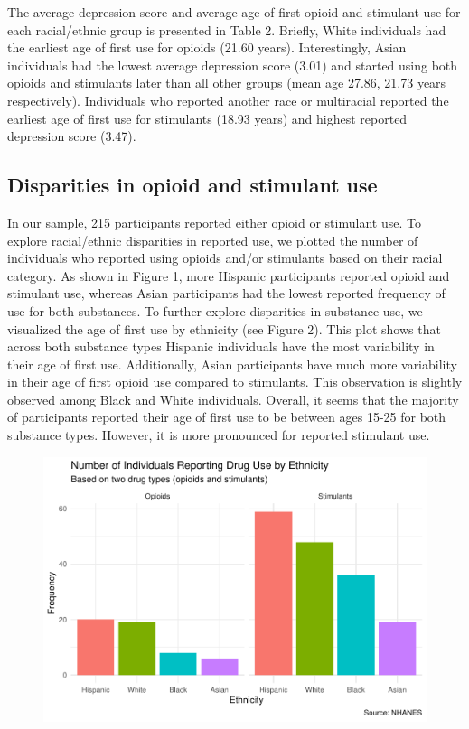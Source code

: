 \documentclass[man]{apa6}
\begin{document}
The average depression score and average age of first opioid and
stimulant use for each racial/ethnic group is presented in Table 2.
Briefly, White individuals had the earliest age of first use for opioids
(21.60 years). Interestingly, Asian individuals had the lowest average
depression score (3.01) and started using both opioids and stimulants
later than all other groups (mean age 27.86, 21.73 years respectively).
Individuals who reported another race or multiracial reported the
earliest age of first use for stimulants (18.93 years) and highest
reported depression score (3.47).

\subsection{Disparities in opioid and stimulant
use}\label{disparities-in-opioid-and-stimulant-use}

In our sample, 215 participants reported either opioid or stimulant use.
To explore racial/ethnic disparities in reported use, we plotted the
number of individuals who reported using opioids and/or stimulants based
on their racial category. As shown in Figure 1, more Hispanic
participants reported opioid and stimulant use, whereas Asian
participants had the lowest reported frequency of use for both
substances. To further explore disparities in substance use, we
visualized the age of first use by ethnicity (see Figure 2). This plot
shows that across both substance types Hispanic individuals have the
most variability in their age of first use. Additionally, Asian
participants have much more variability in their age of first opioid use
compared to stimulants. This observation is slightly observed among
Black and White individuals. Overall, it seems that the majority of
participants reported their age of first use to be between ages 15-25
for both substance types. However, it is more pronounced for reported
stimulant use.

\begin{figure}
\centering
\includegraphics{Final_Paper_Group_3_files/figure-latex/ST_fig1-1.pdf}
\caption{}
\end{figure}
\end{document}

